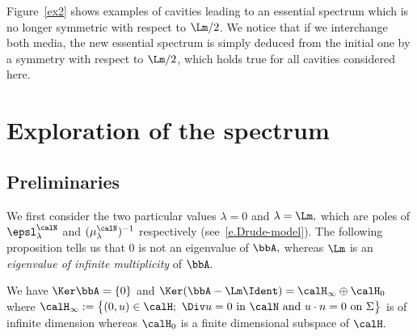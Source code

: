 Figure~\ref{ex2} shows examples of cavities leading to an essential spectrum which is no longer symmetric with respect to $\Lm/2$. We notice that if we interchange both media, the new essential spectrum is simply deduced from the initial one by a symmetry with respect to $\Lm/2$, which holds true for all cavities considered here.


\section{Exploration of the spectrum}\label{s-investigation}

\subsection{Preliminaries}\label{s-prelimin}

We first consider the two particular values $\lambda = 0$ and $\lambda = \Lm,$ which are poles of $\epsl_\lambda^\calN$ and $(\mu_\lambda^\calN)^{-1}$ respectively (see~\eqref{e.Drude-model}). The following proposition tells us that $0$ is not an eigenvalue of $\bbA,$ whereas $\Lm$ is an \emph{eigenvalue of infinite multiplicity} of $\bbA.$

\begin{prop}\label{p.partic-values}
We have $\Ker \bbA = \{0\}$ and $\Ker(\bbA - \Lm\Ident) = \calH_\infty \oplus \calH_0$ where $\calH_\infty := \big\{(0,u) \in \calH;\ \Div u = 0 \text{ in }\calN \text{ and } u \cdot n = 0 \text{ on }\Sigma \big\}$ is of infinite dimension whereas $\calH_0$ is a finite dimensional subspace of $\calH.$
\end{prop}

